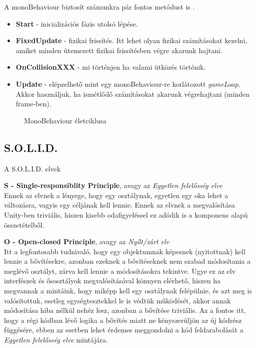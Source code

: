 A monoBehaviour biztosít számunkra pár fontos metódust is \cite{unityDocs}.
\begin{itemize}
	\item \textbf{Start} - inicializációs fázis utolsó lépése.
	\item \textbf{FixedUpdate} - fizikai frissítés. Itt lehet olyan fizikai számításokat kezelni, amiket minden ütemezett fizikai frissítésben végre akarunk hajtani.
	\item \textbf{OnCollisionXXX} - mi történjen ha valami ütközés történik.
	\item \textbf{Update} - elépzelhető mint egy monoBehaviour-re korlátozott \textit{gameLoop}. Akkor használjuk, ha ismétlődő számításokat akarunk végrehajtani (minden frame-ben).
\end{itemize}

\begin{figure}[H]
	\noindent{}
	\caption{MonoBehaviour életciklusa}
	\label{thdfT}
\end{figure}

\subsection{S.O.L.I.D.}
A S.O.L.I.D. elvek\cite{solid}

\textbf{S - Single-responsiblity Principle}, avagy az \textit{Egyetlen felelősség elve}\\
Ennek az elvnek a lényege, hogy egy osztálynak, egyetlen egy oka lehet a változásra, vagyis egy céljának kell lennie. Ennek az elvnek a megvalósítása Unity-ben triviális, hiszen kisebb odafigyeléssel ez adódik is a komponens alapú összetételből.

\textbf{O - Open-closed Principle}, avagy az \textit{Nyílt/zárt elv}\\
Itt a legfontosabb tudnivaló, hogy egy objektumnak képesnek (nyitottnak) kell lennie a bővítésekre, azonban ezeknek a bővítéseknek nem szabad módosítania a meglévő osztályt, zárva kell lennie a módosításokra tekintve. Ugye ez az elv interfészek és ősosztályok megvalósításával könnyen elérhető, hiszen ha megvannak a mintáink, hogy miképp kell egy osztálynak felépülnie, és azt meg is valósítottuk, esetleg egységtesztekkel le is védtük működését, akkor annak módosítása hiba nélkül nehéz lesz, azonban a bővítése triviális. Az a fontos itt, hogy a régi kódban lévő logika a bővítés miatt ne kényszerüljön az új kódrész függésére, ebben az esetben lehet érdemes meggondolni a kód feldarabolását a \textit{Egyetlen felelősség elve} mintájára.

